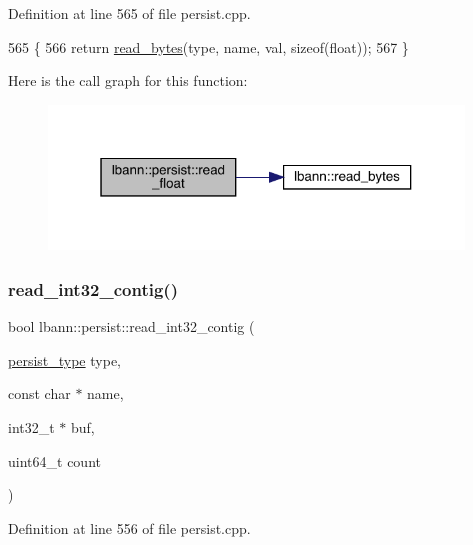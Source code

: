 Definition at line 565 of file persist.\+cpp.


\begin{DoxyCode}
565                                                                              \{
566   \textcolor{keywordflow}{return} \hyperlink{classlbann_1_1persist_af24f635f634c8cf30cf53a0e90ec641b}{read\_bytes}(type, name, val, \textcolor{keyword}{sizeof}(\textcolor{keywordtype}{float}));
567 \}
\end{DoxyCode}
Here is the call graph for this function\+:\nopagebreak
\begin{figure}[H]
\begin{center}
\leavevmode
\includegraphics[width=313pt]{classlbann_1_1persist_ac5e659a6612e5f2911e195fc1b6c045b_cgraph}
\end{center}
\end{figure}
\mbox{\label{classlbann_1_1persist_a2944c32f6634223c0902b38a697a0957}} 
\subsubsection{\texorpdfstring{read\+\_\+int32\+\_\+contig()}{read\_int32\_contig()}}
{\footnotesize\ttfamily bool lbann\+::persist\+::read\+\_\+int32\+\_\+contig (\begin{DoxyParamCaption}\item[{\hyperlink{namespacelbann_adee41f31f15f3906cbdcce4a1417eb56}{persist\+\_\+type}}]{type,  }\item[{const char $\ast$}]{name,  }\item[{int32\+\_\+t $\ast$}]{buf,  }\item[{uint64\+\_\+t}]{count }\end{DoxyParamCaption})}



Definition at line 556 of file persist.\+cpp.


